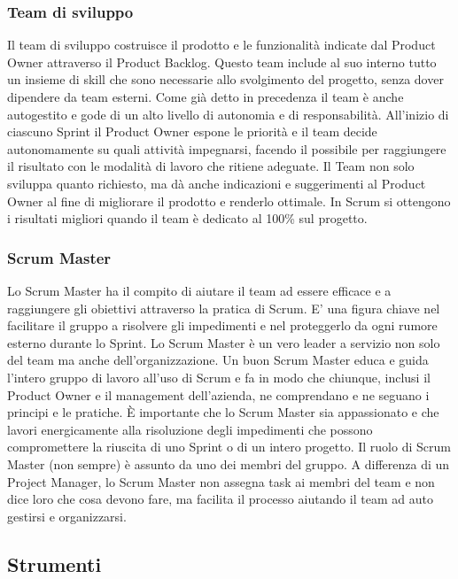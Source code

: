 \documentclass{article}
\begin{document}
\subsubsection{Team di sviluppo}
Il team di sviluppo costruisce il prodotto e le funzionalità indicate dal Product Owner attraverso il Product Backlog. 
Questo team include al suo interno tutto un insieme di skill che sono necessarie allo svolgimento del progetto, senza dover dipendere da team esterni. 
Come già detto in precedenza il team è anche autogestito e gode di un alto livello di autonomia e di responsabilità.
All'inizio di ciascuno Sprint il Product Owner espone le priorità e il team decide autonomamente su quali attività impegnarsi, facendo il possibile 
per raggiungere il risultato con le modalità di lavoro che ritiene adeguate.
Il Team non solo sviluppa quanto richiesto, ma dà anche indicazioni e suggerimenti al Product Owner al fine di migliorare il prodotto e renderlo ottimale.
In Scrum si ottengono i risultati migliori quando il team è dedicato al 100\% sul progetto. 


\subsubsection{Scrum Master}

Lo Scrum Master ha il compito di aiutare il team ad essere efficace e a raggiungere gli obiettivi attraverso la pratica di Scrum. 
E' una figura chiave nel facilitare il gruppo a risolvere gli impedimenti e nel proteggerlo da ogni rumore esterno durante lo Sprint.
Lo Scrum Master è un vero leader a servizio non solo del team ma anche dell'organizzazione.
Un buon Scrum Master educa e guida l'intero gruppo di lavoro all'uso di Scrum e fa in modo che chiunque, inclusi il Product Owner e il management 
dell'azienda, ne comprendano e ne seguano i principi e le pratiche. È importante che lo Scrum Master sia appassionato e che lavori energicamente 
alla risoluzione degli impedimenti che possono compromettere la riuscita di uno Sprint o di un intero progetto.
Il ruolo di Scrum Master (non sempre) è assunto da uno dei membri del gruppo.
A differenza di un Project Manager, lo Scrum Master non assegna task ai membri del team e non dice loro che cosa devono fare, ma facilita il processo 
aiutando il team ad auto gestirsi e organizzarsi.

\newpage
\subsection{Strumenti}
\end{document}
